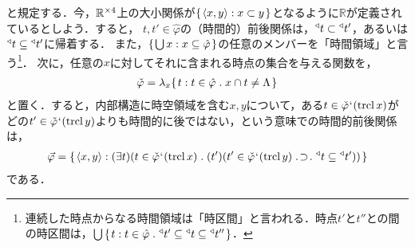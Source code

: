 と規定する．今，$ \mathbb{R}^{\times 4} $上の大小関係が$ \{\mspace{2mu}\langle x,y \rangle:x\subset y\mspace{2mu}\} $となるように$\mathbb{R}$が定義されているとしよう．すると，
$t,t'\in\hat{\varphi}$の（時間的）前後関係は，$ {^\triangleleft}t\subset{^\triangleleft}t' $，あるいは$ {^\triangleleft}t\subseteq{^\triangleleft}t' $に帰着する．
また，$ \{\mspace{2mu}{\textstyle\bigcup}\mspace{3mu}x:x\subseteq\hat\varphi\mspace{2mu}\} $の任意のメンバーを「時間領域」と言う\footnote{連続した時点からなる時間領域は「時区間」と言われる．時点$t'$と$t''$との間の時区間は，$ \union{\classab{t:t\in\hat{\varphi}\con{1}\trgl{t'}\subseteq \trgl{t}\subseteq \trgl{t''}}} $．}．
次に，任意の$ x $に対してそれに含まれる時点の集合を与える関数を，
\begin{align*}
    \check{\varphi} =  \lambda_x\classab{t:t\in\hat{\varphi}\con{1}x\cap t\neq\Lambda}
\end{align*}
と置く．すると，内部構造に時空領域を含む$x,y$について，ある$t\in\check{\varphi}{\mspace{1mu}{`}\mspace{1mu}}(\operatorname{trcl} x)$がどの$t'\in\check{\varphi}{\mspace{1mu}{`}\mspace{1mu}}(\operatorname{trcl} y)$よりも時間的に後ではない，という意味での時間的前後関係は，
\begin{align*}
    \vec{\varphi} = \classab{\orp{x,y}:
    (\exists t)(t\in\check{\varphi}\fap(\trcl x)\con{1}
    (t')(t'\in\check{\varphi}\fap(\trcl y)\case{1}{1}{1}\trgl{t}\subseteq\trgl{t'}))
    }
\end{align*}
である．

